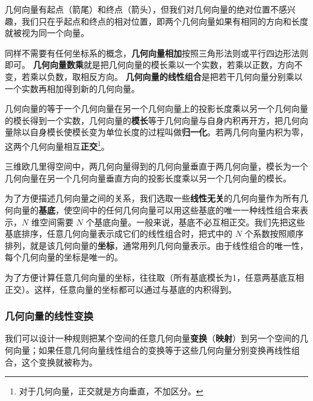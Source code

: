 几何向量有起点（箭尾）和终点（箭头），但我们对几何向量的绝对位置不感兴趣，我们只在乎起点和终点的相对位置，即两个几何向量如果有相同的方向和长度就被视为同一个向量。

 同样不需要有任何坐标系的概念，\textbf{几何向量相加}按照三角形法则或平行四边形法则即可。
\textbf{几何向量数乘}就是把几何向量的模长乘以一个实数，若乘以正数，方向不变，若乘以负数，取相反方向。 \textbf{几何向量的线性组合}是把若干几何向量分别乘以一个实数再相加得到新的几何向量。

几何向量的等于一个几何向量在另一个几何向量上的投影长度乘以另一个几何向量的模长得到一个实数，几何向量的\textbf{模长}等于几何向量与自身内积再开方，把几何向量除以自身模长使模长变为单位长度的过程叫做\textbf{归一化}。若两几何向量内积为零，这两个几何向量相互\textbf{正交}\footnote{对于几何向量，正交就是方向垂直，不加区分。}。

三维欧几里得空间中，两几何向量得到的几何向量垂直于两几何向量，模长为一个几何向量在另一个几何向量垂直方向的投影长度乘以另一个几何向量的模长。

为了方便描述几何向量之间的关系，我们选取一些\textbf{线性无关}的几何向量作为所有几何向量的\textbf{基底}，使空间中的任何几何向量可以用这些基底的唯一一种线性组合来表示，$N$ 维空间需要 $N$ 个基底向量。一般来说，基底不必互相正交。我们先把这些基底排序，任意几何向量表示成它们的线性组合时，把式中的 $N$ 个系数按照顺序排列，就是该几何向量的\textbf{坐标}，通常用列几何向量表示。由于线性组合的唯一性，每个几何向量的坐标是唯一的。

为了方便计算任意几何向量的坐标，往往取（所有基底模长为1，任意两基底互相正交）。这样，任意向量的坐标都可以通过与基底的内积得到。


\subsubsection{几何向量的线性变换}

我们可以设计一种规则把某个空间的任意几何向量\textbf{变换}（\textbf{映射}）到另一个空间的几何向量；如果任意几何向量线性组合的变换等于这些几何向量分别变换再线性组合，这个变换就被称为。





